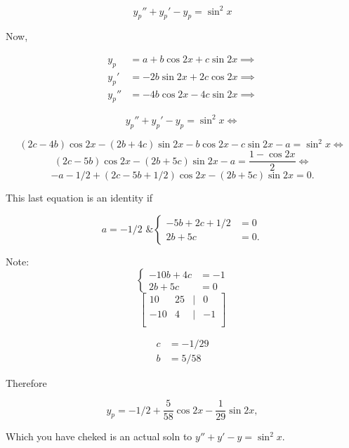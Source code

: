\begin{example}
  \[ y_p'' + y_p' - y_p = \sin^2x \]

  Now, 

  \begin{align*}
    y_p &= a + b\cos 2x + c \sin 2x \implies \\
    y_p' &= -2b\sin2x + 2c\cos2x \implies \\
    y_p'' &= -4b\cos2x -4c\sin2x \implies
  \end{align*}

  \[ y_p'' + y_p' - y_p = \sin^2x \iff \]

  \[ (2c-4b)\cos2x - (2b+4c)\sin2x - b\cos2x -c\sin2x -a = \sin^2x \iff \]
  \[ (2c-5b)\cos2x - (2b+5c)\sin2x -a = \frac{1-\cos2x}{2} \iff \]
  \[ -a-1/2+(2c-5b+1/2)\cos2x - (2b+5c)\sin2x = 0. \]

  This last equation is an identity if 

  \[ a = -1/2 \text{ \& } 
  \begin{cases}
    -5b + 2c + 1/2 &= 0 \\
    2b + 5c &=0.
  \end{cases}
  \]

  Note:
  \[
  \begin{cases}
    -10b + 4c &= -1 \\
    2b + 5c &= 0
  \end{cases}
  \]
\[
  \begin{bmatrix}
    10 & 25 & | & 0 \\
    -10 & 4 & | & -1 \\
  \end{bmatrix}
\]

  \begin{align*}
    c &= -1/29 \\
    b &= 5/58
  \end{align*}

  Therefore

  \[ y_p = -1/2 + \frac{5}{58} \cos2x - \frac{1}{29}\sin2x, \]

  Which you have cheked is an actual soln to \( y'' + y' -y = \sin^2x. \)

\end{example}


